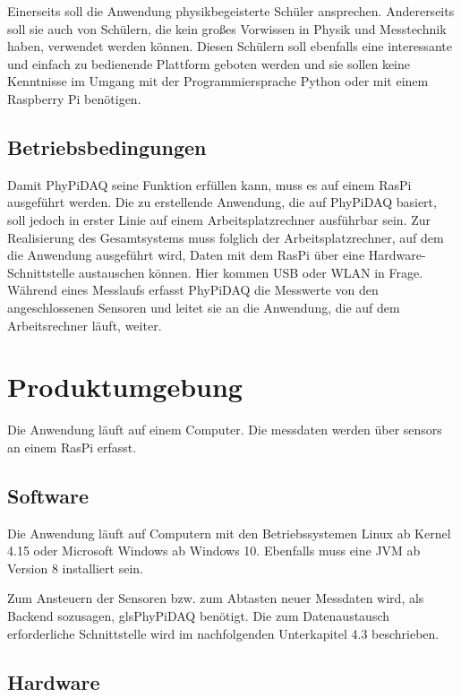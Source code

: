 \documentclass[parskip=full]{scrartcl}
\begin{document}
Einerseits soll die Anwendung physikbegeisterte Schüler ansprechen. Andererseits soll sie auch von Schülern, die kein großes Vorwissen in Physik und Messtechnik haben, verwendet werden können. Diesen Schülern soll ebenfalls eine interessante und einfach zu bedienende Plattform geboten werden und sie sollen keine Kenntnisse im Umgang mit der Programmiersprache Python oder mit einem Raspberry Pi benötigen.


\subsection{Betriebsbedingungen}

Damit \gls{PhyPiDAQ} seine Funktion erfüllen kann, muss es auf einem \gls{RasPi} ausgeführt werden. Die zu erstellende Anwendung, die auf PhyPiDAQ basiert, soll jedoch in erster Linie auf einem Arbeitsplatzrechner ausführbar sein. Zur Realisierung des Gesamtsystems muss folglich der Arbeitsplatzrechner, auf dem die Anwendung ausgeführt wird, Daten mit dem \gls{RasPi} über eine Hardware-Schnittstelle austauschen können. Hier kommen USB oder WLAN in Frage. Während eines Messlaufs erfasst \gls{PhyPiDAQ}  die Messwerte von den angeschlossenen Sensoren und leitet sie an die Anwendung, die auf dem Arbeitsrechner läuft, weiter. 


\clearpage
\section{Produktumgebung}\label{produktumgebung}

Die Anwendung läuft auf einem Computer. Die \gls{messdaten} werden über \glspl{sensor} an einem \gls{RasPi} erfasst.

\subsection{Software}

Die Anwendung läuft auf Computern mit den Betriebssystemen Linux ab Kernel 4.15 oder Microsoft Windows ab Windows 10.
Ebenfalls muss eine \gls{JVM} ab Version 8 installiert sein. 

Zum Ansteuern der Sensoren bzw. zum Abtasten neuer Messdaten wird, als Backend sozusagen, gls{PhyPiDAQ} benötigt. Die zum Datenaustausch erforderliche Schnittstelle wird im nachfolgenden Unterkapitel 4.3 beschrieben. 

\subsection{Hardware}
\end{document}
